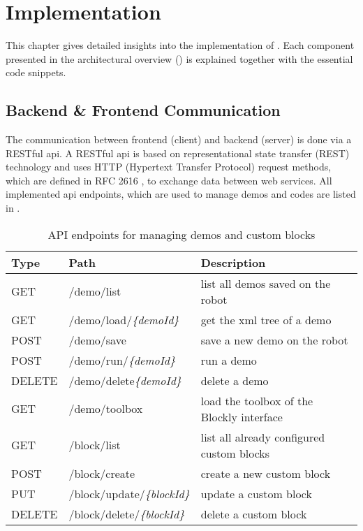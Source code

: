 \chapter{Implementation}
This chapter gives detailed insights into the implementation of \toolname{}. Each component presented in the architectural overview () is explained together with the essential code snippets.

\section{Backend \& Frontend Communication}
The communication between frontend (client) and backend (server) is done via a RESTful \gls{api}. A RESTful \gls{api} is based on representational state transfer (REST) technology and uses HTTP (Hypertext Transfer Protocol) request methods, which are defined in RFC 2616 \cite{RFC2616}, to exchange data between web services. All implemented \gls{api} endpoints, which are used to manage demos and codes are listed in .

\begin{table}[htbp]
	\centering
	\begin{tabular}{l l l}
		\toprule
		Type   & Path                               & Description                                     \\
		\midrule
		GET    & /demo/list                         & list all demos saved on the robot               \\
		GET    & /demo/load/\textit{\{demoId\}}     & get the \gls{xml} tree of a demo        \\
		POST   & /demo/save                         & save a new demo on the robot                    \\
		POST   & /demo/run/\textit{\{demoId\}}      & run a demo                                      \\
		DELETE & /demo/delete\textit{\{demoId\}}    & delete a demo                                   \\
		GET    & /demo/toolbox                      & load the toolbox of the Blockly interface       \\
		GET    & /block/list                        & list all already configured custom blocks       \\
		POST   & /block/create                      & create a new custom block                       \\
		PUT    & /block/update/\textit{\{blockId\}} & update a custom block                           \\
		DELETE & /block/delete/\textit{\{blockId\}} & delete a custom block                           \\
		\bottomrule
	\end{tabular}
	\caption{API endpoints for managing demos and custom blocks}
	\label{tab:APIspec}
\end{table}

